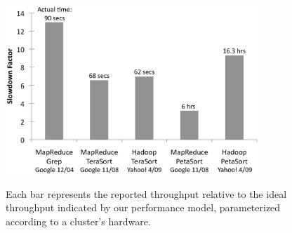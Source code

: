 {
\renewcommand{\baselinestretch}{1.0}
\begin{figure}[t]
\begin{center}

   \includegraphics[height=2.5in]{fig_slowdown.eps}

\end{center}
 {Each bar represents the reported throughput relative to
  the ideal throughput indicated by our performance model,
  parameterized according to a cluster's hardware.  }

\label{fig:slowdown}
\end{figure}
}

